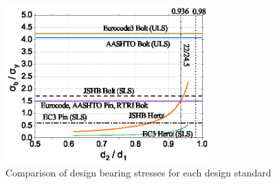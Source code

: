 \begin{figure}[htbp]
    \centering
    \includegraphics[width=0.7\textwidth]{imgs/app/eachcode-fb.eps}
    \caption{Comparison of design bearing stresses for each design standard}
    \label{fig-baecoefficient}
\end{figure}    


